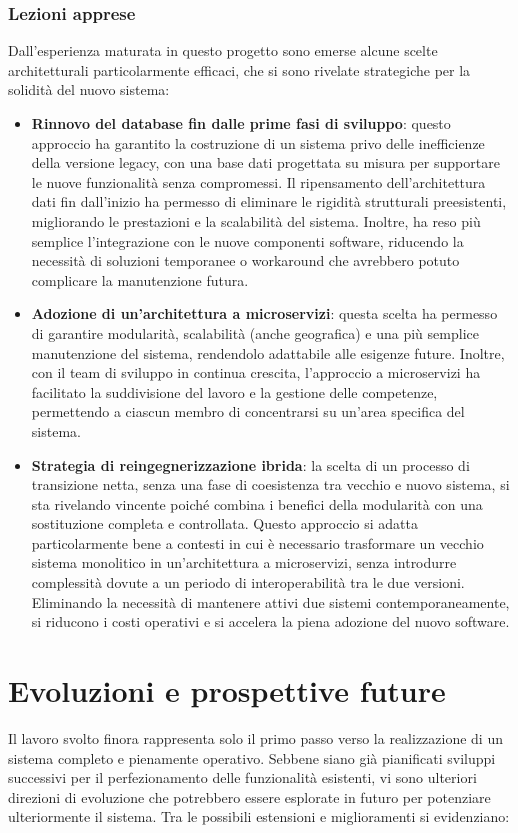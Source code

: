 \subsubsection{Lezioni apprese}
Dall’esperienza maturata in questo progetto sono emerse alcune scelte architetturali particolarmente efficaci, che si sono rivelate strategiche per la solidità del nuovo sistema:

\begin{itemize}
  \item \textbf{Rinnovo del database fin dalle prime fasi di sviluppo}: questo approccio ha garantito la costruzione di un sistema privo delle inefficienze della versione legacy, con una base dati progettata su misura per supportare le nuove funzionalità senza compromessi. Il ripensamento dell’architettura dati fin dall'inizio ha permesso di eliminare le rigidità strutturali preesistenti, migliorando le prestazioni e la scalabilità del sistema. Inoltre, ha reso più semplice l’integrazione con le nuove componenti software, riducendo la necessità di soluzioni temporanee o workaround che avrebbero potuto complicare la manutenzione futura.

  \item \textbf{Adozione di un'architettura a microservizi}: questa scelta ha permesso di garantire modularità, scalabilità (anche geografica) e una più semplice manutenzione del sistema, rendendolo adattabile alle esigenze future. Inoltre, con il team di sviluppo in continua crescita, l'approccio a microservizi ha facilitato la suddivisione del lavoro e la gestione delle competenze, permettendo a ciascun membro di concentrarsi su un'area specifica del sistema.

  \item \textbf{Strategia di reingegnerizzazione ibrida}: la scelta di un processo di transizione netta, senza una fase di coesistenza tra vecchio e nuovo sistema, si sta rivelando vincente poiché combina i benefici della modularità con una sostituzione completa e controllata. Questo approccio si adatta particolarmente bene a contesti in cui è necessario trasformare un vecchio sistema monolitico in un’architettura a microservizi, senza introdurre complessità dovute a un periodo di interoperabilità tra le due versioni. Eliminando la necessità di mantenere attivi due sistemi contemporaneamente, si riducono i costi operativi e si accelera la piena adozione del nuovo software.
\end{itemize}

\section{Evoluzioni e prospettive future}
Il lavoro svolto finora rappresenta solo il primo passo verso la realizzazione di un sistema completo e pienamente operativo. Sebbene siano già pianificati sviluppi successivi per il perfezionamento delle funzionalità esistenti, vi sono ulteriori direzioni di evoluzione che potrebbero essere esplorate in futuro per potenziare ulteriormente il sistema. Tra le possibili estensioni e miglioramenti si evidenziano:

